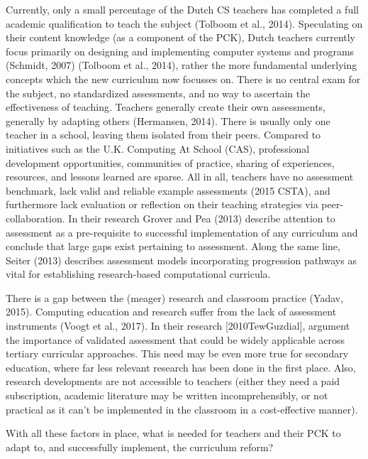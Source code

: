 Currently, only a small percentage of the Dutch CS teachers has completed a full academic qualification to teach the subject (Tolboom et al., 2014). Speculating on their content knowledge (as a component of the PCK), Dutch teachers currently focus primarily on designing and implementing computer systems and programs (Schmidt, 2007) (Tolboom et al., 2014), rather the more fundamental underlying concepts which the new curriculum now focusses on. There is no central exam for the subject, no standardized assessments, and no way to ascertain the effectiveness of teaching. Teachers generally create their own assessments, generally by adapting others (Hermansen, 2014). There is usually only one teacher in a school, leaving them isolated from their peers. Compared to initiatives such as the U.K. Computing At School (CAS), professional development opportunities, communities of practice, sharing of experiences, resources, and lessons learned are sparse. All in all, teachers have no assessment benchmark, lack valid and reliable example assessments (2015 CSTA), and furthermore lack evaluation or reflection on their teaching strategies via peer-collaboration. In their research Grover and Pea (2013) describe attention to assessment as a pre-requisite to successful implementation of any curriculum and conclude that large gaps exist pertaining to assessment. Along the same line, Seiter (2013) describes assessment models incorporating progression pathways as vital for establishing research-based computational curricula.


There is a gap between the (meager) research and classroom practice (Yadav, 2015).  Computing education and research suffer from the lack of assessment instruments (Voogt et al., 2017). In their research [2010TewGuzdial], argument the importance of validated assessment that could be widely applicable across tertiary curricular approaches. This need may be even more true for secondary education, where far less relevant research has been done in the first place. Also, research developments are not accessible to teachers (either they need a paid subscription, academic literature may be written incomprehensibly, or not practical as it can't be implemented in the classroom in a cost-effective manner).

With all these factors in place, what is needed for teachers and their PCK to adapt to, and successfully implement, the curriculum reform?
